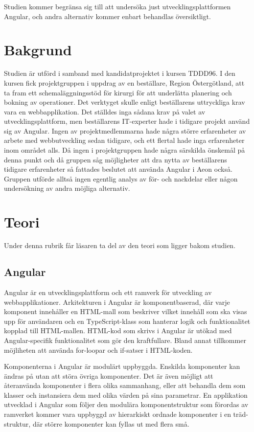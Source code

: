 Studien kommer begränsa sig till att undersöka just utvecklingsplattformen Angular, och andra alternativ kommer enbart behandlas översiktligt.

\section{Bakgrund}


Studien är utförd i samband med kandidatprojektet i kursen TDDD96. I den kursen fick projektgruppen i uppdrag av en beställare, Region Östergötland, att ta fram ett schemaläggningsstöd för kirurgi för att underlätta planering och bokning av operationer. Det verktyget skulle enligt beställarens uttryckliga krav vara en webbapplikation. Det ställdes inga sådana krav på valet av utvecklingsplattform, men beställarens IT-experter hade i tidigare projekt använd sig av Angular. Ingen av projektmedlemmarna hade några större erfarenheter av arbete med webbutveckling sedan tidigare, och ett flertal hade inga erfarenheter inom området alls. Då ingen i projektgruppen hade några särskilda önskemål på denna punkt och då gruppen såg möjligheter att dra nytta av beställarens tidigare erfarenheter så fattades beslutet att använda Angular i Aeon också. Gruppen utförde alltså ingen egentlig analys av för- och nackdelar eller någon undersökning av andra möjliga alternativ.  

\section{Teori}

Under denna rubrik får läsaren ta del av den teori som ligger bakom studien.

\subsection{Angular} \label{martin_angular}

Angular är en utvecklingsplattform och ett ramverk för utveckling av webbapplikationer. Arkitekturen i Angular är komponentbaserad, där varje komponent innehåller en HTML-mall som beskriver vilket innehåll som ska visas upp för användaren och en TypeScript-klass som hanterar logik och funktionalitet kopplad till HTML-mallen. HTML-kod som skrivs i Angular är utökad med Angular-specifik funktionalitet som gör den kraftfullare. Bland annat tillkommer möjliheten att använda for-loopar och if-satser i HTML-koden.

Komponenterna i Angular är modulärt uppbyggda. Enskilda komponenter kan ändras på utan att störa övriga komponenter. Det är även möjligt att återanvända komponenter i flera olika sammanhang, eller att behandla dem som klasser och instansiera dem med olika värden på sina parametrar. En applikation utvecklad i Angular som följer den modulära komponentstruktur som förordas av ramverket kommer vara uppbyggd av hierarkiskt ordnade komponenter i en träd-struktur, där större komponenter kan fyllas ut med flera små.   

